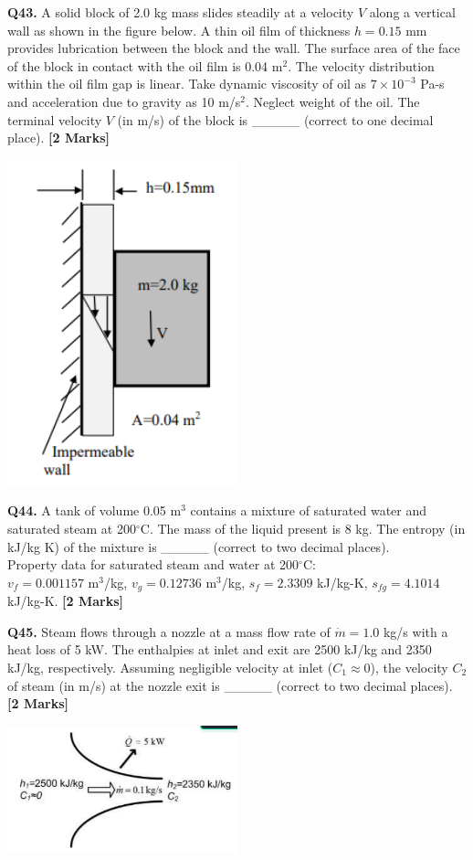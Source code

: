 \documentclass[11pt]{article}
\newcommand{\questionb}[2]{
    \noindent\textbf{Q#2.} #1 \hfill \textbf{[2 Marks]}
}
\begin{document}
\questionb{A solid block of 2.0 kg mass slides steadily at a velocity \( V \) along a vertical wall as shown in the figure below. A thin oil film of thickness \( h = 0.15 \) mm provides lubrication between the block and the wall. The surface area of the face of the block in contact with the oil film is 0.04 m\(^2\). The velocity distribution within the oil film gap is linear. Take dynamic viscosity of oil as \( 7 \times 10^{-3} \) Pa-s and acceleration due to gravity as 10 m/s\(^2\). Neglect weight of the oil. The terminal velocity \( V \) (in m/s) of the block is \_\_\_\_\_ (correct to one decimal place).}{43}
\begin{center}
\includegraphics[width=0.5\textwidth]{figures/43.png}
\end{center}
\vspace{0.5cm}

\questionb{A tank of volume 0.05 m\(^3\) contains a mixture of saturated water and saturated steam at 200\(^\circ\)C. The mass of the liquid present is 8 kg. The entropy (in kJ/kg K) of the mixture is \_\_\_\_\_ (correct to two decimal places). \\
Property data for saturated steam and water at 200\(^\circ\)C: \\
\( v_f = 0.001157 \) m\(^3\)/kg, \( v_g = 0.12736 \) m\(^3\)/kg, \( s_f = 2.3309 \) kJ/kg-K, \( s_{fg} = 4.1014 \) kJ/kg-K.}{44}
\vspace{0.5cm}

\questionb{Steam flows through a nozzle at a mass flow rate of \( \dot{m} = 1.0 \) kg/s with a heat loss of 5 kW. The enthalpies at inlet and exit are 2500 kJ/kg and 2350 kJ/kg, respectively. Assuming negligible velocity at inlet (\( C_1 \approx 0 \)), the velocity \( C_2 \) of steam (in m/s) at the nozzle exit is \_\_\_\_\_ (correct to two decimal places).}{45}
\begin{center}
\includegraphics[width=0.5\textwidth]{figures/45.png}
\end{center}
\vspace{0.5cm}
\end{document}
